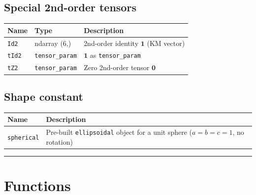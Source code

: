 \documentclass[
  a4paper,
  numbers=noendperiod,
  DIV=12]{scrreprt}
\newcounter{none} %
\newcommand{\uu}[1]{{\symbf{{#1}}}}
\begin{document}
\subsection{Special 2nd-order tensors}\label{special-2nd-order-tensors}

{\def\LTcaptype{none} %
\begin{longtable}[]{@{}lll@{}}
\toprule\noalign{}
Name & Type & Description \\
\midrule\noalign{}
\endhead
\bottomrule\noalign{}
\endlastfoot
\texttt{Id2} & ndarray (6,) & 2nd-order identity \(\uu{1}\) (KM
vector) \\
\texttt{tId2} & \texttt{tensor\_param} & \(\uu{1}\) as
\texttt{tensor\_param} \\
\texttt{tZ2} & \texttt{tensor\_param} & Zero 2nd-order tensor
\(\uu{0}\) \\
\end{longtable}
}

\subsection{Shape constant}\label{shape-constant}

{\def\LTcaptype{none} %
\begin{longtable}[]{@{}
  >{\raggedright\arraybackslash}p{}
  >{\raggedright\arraybackslash}p{}@{}}
\toprule\noalign{}
\begin{minipage}[b]{\linewidth}\raggedright
Name
\end{minipage} & \begin{minipage}[b]{\linewidth}\raggedright
Description
\end{minipage} \\
\midrule\noalign{}
\endhead
\bottomrule\noalign{}
\endlastfoot
\texttt{spherical} & Pre-built \texttt{ellipsoidal} object for a unit
sphere (\(a=b=c=1\), no rotation) \\
\end{longtable}
}

\begin{center}\rule{0.5\linewidth}{0.5pt}\end{center}

\section{Functions}\label{sec-api-functions}
\end{document}
